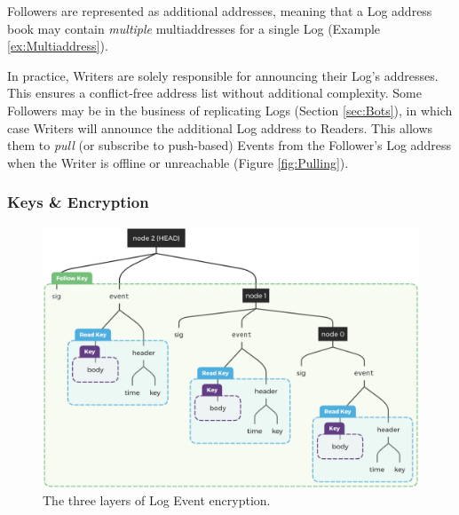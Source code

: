 \documentclass{textile}
\begin{document}
Followers are represented as additional addresses, meaning that a Log address book may contain \emph{multiple} multiaddresses for a single Log (Example \ref{ex:Multiaddress}).

In practice, Writers are solely responsible for announcing their Log's addresses. This ensures a conflict-free address list without additional complexity. Some Followers may be in the business of replicating Logs (Section  \ref{sec:Bots}), in which case Writers will announce the additional Log address to Readers. This allows them to \emph{pull} (or subscribe to push-based) Events from the Follower's Log address when the Writer is offline or unreachable (Figure \ref{fig:Pulling}).

\subsubsection{Keys \& Encryption} \label{sec:KeysEncryption}

\begin{figure}[!t]
\centering
\begin{minipage}{0.6\textwidth}
  \includegraphics[width=\linewidth]{figures/Event_Log_With_Encryption.png}
  \caption{The three layers of Log Event encryption.}
  \label{fig:LogEncryption}
  \end{minipage}
\end{figure}
\end{document}
